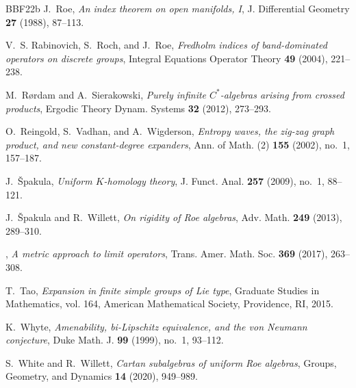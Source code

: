 \documentclass[11pt]{amsart}
\numberwithin{equation}{section}
\theoremstyle{definition}
\theoremstyle{remark}
\numberwithin{equation}{section}
\begin{document}
\begin{thebibliography}{BBF{\etalchar{+}}22b}
J.~Roe, \emph{An index theorem on open manifolds, {I}}, J. Differential
  Geometry \textbf{27} (1988), 87--113.

V.~S. Rabinovich, S.~Roch, and J.~Roe, \emph{Fredholm indices of band-dominated
  operators on discrete groups}, Integral Equations Operator Theory \textbf{49}
  (2004), 221--238.

M.~R\o{}rdam and A.~Sierakowski, \emph{Purely infinite ${C}^*$-algebras arising
  from crossed products}, Ergodic Theory Dynam. Systems \textbf{32} (2012),
  273--293.

O.~Reingold, S.~Vadhan, and A.~Wigderson, \emph{Entropy waves, the zig-zag
  graph product, and new constant-degree expanders}, Ann. of Math. (2)
  \textbf{155} (2002), no.~1, 157--187. 

J.~{\v{S}}pakula, \emph{Uniform ${K}$-homology theory}, J. Funct. Anal.
  \textbf{257} (2009), no.~1, 88--121.

J.~{\v{S}}pakula and R.~Willett, \emph{On rigidity of {R}oe algebras}, Adv.
  Math. \textbf{249} (2013), 289--310.

\bysame, \emph{A metric approach to limit operators}, Trans. Amer. Math. Soc.
  \textbf{369} (2017), 263--308.

T.~Tao, \emph{Expansion in finite simple groups of {L}ie type}, Graduate
  Studies in Mathematics, vol. 164, American Mathematical Society, Providence,
  RI, 2015. 

K.~Whyte, \emph{Amenability, bi-{L}ipschitz equivalence, and the von {N}eumann
  conjecture}, Duke Math. J. \textbf{99} (1999), no.~1, 93--112. 

S.~{White} and R.~Willett, \emph{{Cartan subalgebras of uniform {R}oe
  algebras}}, Groups, Geometry, and Dynamics \textbf{14} (2020), 949--989.

\end{thebibliography}

 
\end{document}
